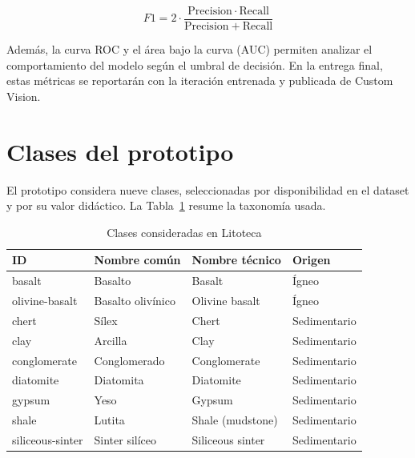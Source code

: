 \begin{equation}
  F1 = 2 \cdot \frac{\mathrm{Precision} \cdot \mathrm{Recall}}{\mathrm{Precision} + \mathrm{Recall}}
  \label{eq:f1}
\end{equation}

Además, la curva ROC y el área bajo la curva (AUC) permiten analizar el
comportamiento del modelo según el umbral de decisión. En la entrega final, estas
métricas se reportarán con la iteración entrenada y publicada de Custom Vision.

\section{Clases del prototipo}

El prototipo considera nueve clases, seleccionadas por disponibilidad en el dataset
y por su valor didáctico. La Tabla~\ref{tab:clases} resume la taxonomía usada.

\begin{table}[H]
  \centering
  \caption{Clases consideradas en Litoteca}
  \label{tab:clases}
  \begin{tabular}{@{}llll@{}}
    \toprule
    ID & Nombre común & Nombre técnico & Origen \\
    \midrule
    basalt & Basalto & Basalt & Ígneo \\
    olivine-basalt & Basalto olivínico & Olivine basalt & Ígneo \\
    chert & Sílex & Chert & Sedimentario \\
    clay & Arcilla & Clay & Sedimentario \\
    conglomerate & Conglomerado & Conglomerate & Sedimentario \\
    diatomite & Diatomita & Diatomite & Sedimentario \\
    gypsum & Yeso & Gypsum & Sedimentario \\
    shale & Lutita & Shale (mudstone) & Sedimentario \\
    siliceous-sinter & Sinter silíceo & Siliceous sinter & Sedimentario \\
    \bottomrule
  \end{tabular}
\end{table}
